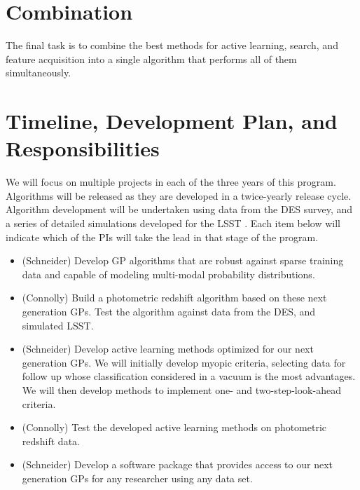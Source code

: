 \documentclass[prd,nofootbib,floatfix,11pt,tightenlines]{revtex4}
\begin{document}
\section{Combination}

The final task is to combine the best methods for active learning, search,
and feature acquisition into a single algorithm that performs all of them
simultaneously.

\section{Timeline, Development Plan, and Responsibilities}

We will focus on multiple projects in each of the three years of this
program.  Algorithms will be released as they are developed in a
twice-yearly release cycle.  Algorithm development will be undertaken
using data from the DES survey, and  a series of detailed
simulations developed for the LSST \cite{connolly10}.  Each
item below will indicate which of the PIs will take the lead in that stage
of the program.

\vspace{.5\baselineskip}
\begin{itemize}

\item (Schneider) Develop GP algorithms that are robust against sparse training data and
capable of modeling multi-modal probability
distributions.  

\item (Connolly) Build a photometric redshift algorithm based on these next generation
GPs.  Test the algorithm against data from the DES, and simulated LSST.

\item (Schneider) Develop active learning methods optimized for our next generation GPs.
We will initially develop myopic criteria, selecting data for follow up whose classification
considered in a vacuum is the most advantages.  We will then develop methods to implement
one- and two-step-look-ahead criteria.

\item (Connolly) Test the developed active learning methods on photometric redshift data.

\item (Schneider) 
Develop a software package that provides access to our next generation GPs for
any researcher using any data set.

\end{itemize}
\vspace{.5\baselineskip}
\end{document}
